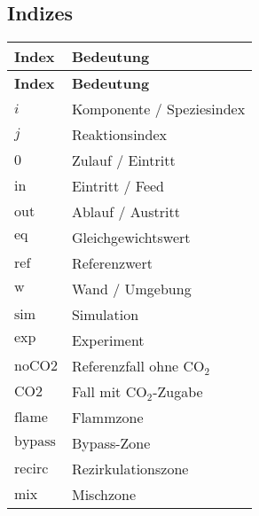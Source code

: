 \subsection*{Indizes}
\begin{small}
\begin{flushleft}
\begin{longtable}{@{}ll@{}}
\toprule
\textbf{Index} & \textbf{Bedeutung} \\
\midrule
\endfirsthead
\toprule
\textbf{Index} & \textbf{Bedeutung} \\
\midrule
\endhead
\bottomrule
\endlastfoot
$i$                 & Komponente / Speziesindex \\
$j$                 & Reaktionsindex \\
$0$                 & Zulauf / Eintritt \\
$\mathrm{in}$       & Eintritt / Feed \\
$\mathrm{out}$      & Ablauf / Austritt \\
$\mathrm{eq}$       & Gleichgewichtswert \\
$\mathrm{ref}$      & Referenzwert \\
$\mathrm{w}$        & Wand / Umgebung \\
$\mathrm{sim}$      & Simulation \\
$\mathrm{exp}$      & Experiment \\
$\mathrm{noCO2}$    & Referenzfall ohne CO$_2$ \\
$\mathrm{CO2}$      & Fall mit CO$_2$-Zugabe \\
$\mathrm{flame}$    & Flammzone \\
$\mathrm{bypass}$   & Bypass-Zone \\
$\mathrm{recirc}$   & Rezirkulationszone \\
$\mathrm{mix}$      & Mischzone \\
\end{longtable}
\end{flushleft}
\end{small}

